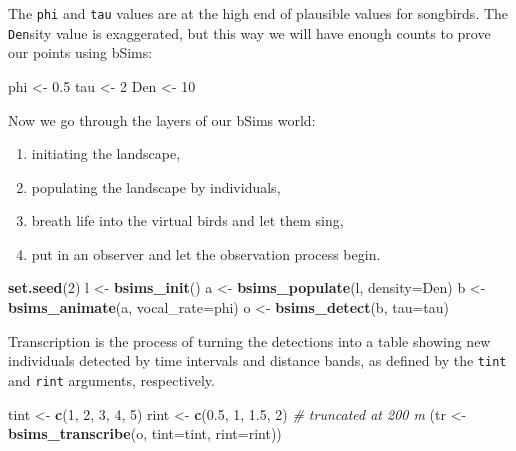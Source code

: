\documentclass[12pt,]{book}
\newenvironment{Shaded}{\begin{snugshade}}{\end{snugshade}}
\newcommand{\CommentTok}[1]{\textcolor[rgb]{0.56,0.35,0.01}{\textit{#1}}}
\newcommand{\DataTypeTok}[1]{\textcolor[rgb]{0.13,0.29,0.53}{#1}}
\newcommand{\DecValTok}[1]{\textcolor[rgb]{0.00,0.00,0.81}{#1}}
\newcommand{\FloatTok}[1]{\textcolor[rgb]{0.00,0.00,0.81}{#1}}
\newcommand{\KeywordTok}[1]{\textcolor[rgb]{0.13,0.29,0.53}{\textbf{#1}}}
\newcommand{\NormalTok}[1]{#1}
\newcommand{\StringTok}[1]{\textcolor[rgb]{0.31,0.60,0.02}{#1}}
\providecommand{\tightlist}{%
  \setlength{\itemsep}{0pt}\setlength{\parskip}{0pt}}
\begin{document}
The \texttt{phi} and \texttt{tau} values are at the high end of plausible
values for songbirds. The \texttt{Den}sity value is exaggerated,
but this way we will have enough counts to prove our points
using bSims:

\begin{Shaded}
\begin{Highlighting}[]
\NormalTok{phi <-}\StringTok{ }\FloatTok{0.5}
\NormalTok{tau <-}\StringTok{ }\DecValTok{2}
\NormalTok{Den <-}\StringTok{ }\DecValTok{10}
\end{Highlighting}
\end{Shaded}

Now we go through the layers of our bSims world:

\begin{enumerate}
\def\labelenumi{\arabic{enumi}.}
\tightlist
\item
  initiating the landscape,
\item
  populating the landscape by individuals,
\item
  breath life into the virtual birds and let them sing,
\item
  put in an observer and let the observation process begin.
\end{enumerate}

\begin{Shaded}
\begin{Highlighting}[]
\KeywordTok{set.seed}\NormalTok{(}\DecValTok{2}\NormalTok{)}
\NormalTok{l <-}\StringTok{ }\KeywordTok{bsims_init}\NormalTok{()}
\NormalTok{a <-}\StringTok{ }\KeywordTok{bsims_populate}\NormalTok{(l, }\DataTypeTok{density=}\NormalTok{Den)}
\NormalTok{b <-}\StringTok{ }\KeywordTok{bsims_animate}\NormalTok{(a, }\DataTypeTok{vocal_rate=}\NormalTok{phi)}
\NormalTok{o <-}\StringTok{ }\KeywordTok{bsims_detect}\NormalTok{(b, }\DataTypeTok{tau=}\NormalTok{tau)}
\end{Highlighting}
\end{Shaded}

Transcription is the process of turning the detections
into a table showing new individuals detected by
time intervals and distance bands, as defined
by the \texttt{tint} and \texttt{rint} arguments, respectively.

\begin{Shaded}
\begin{Highlighting}[]
\NormalTok{tint <-}\StringTok{ }\KeywordTok{c}\NormalTok{(}\DecValTok{1}\NormalTok{, }\DecValTok{2}\NormalTok{, }\DecValTok{3}\NormalTok{, }\DecValTok{4}\NormalTok{, }\DecValTok{5}\NormalTok{)}
\NormalTok{rint <-}\StringTok{ }\KeywordTok{c}\NormalTok{(}\FloatTok{0.5}\NormalTok{, }\DecValTok{1}\NormalTok{, }\FloatTok{1.5}\NormalTok{, }\DecValTok{2}\NormalTok{) }\CommentTok{# truncated at 200 m}
\NormalTok{(tr <-}\StringTok{ }\KeywordTok{bsims_transcribe}\NormalTok{(o, }\DataTypeTok{tint=}\NormalTok{tint, }\DataTypeTok{rint=}\NormalTok{rint))}
\end{Highlighting}
\end{Shaded}
\end{document}

